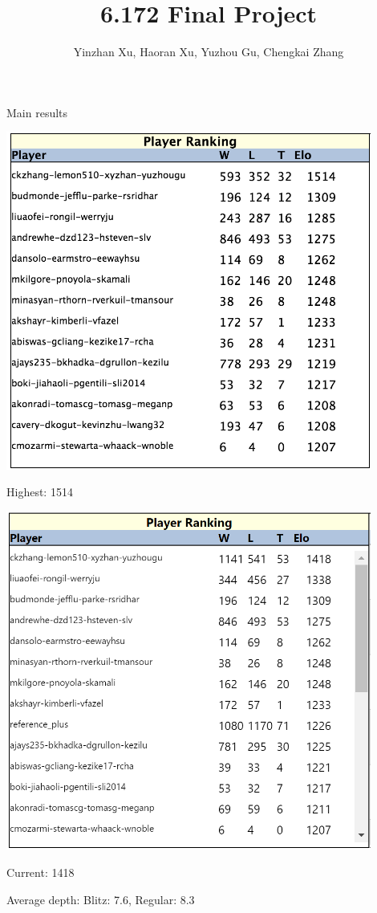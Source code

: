 \documentclass[10pt]{beamer}
\begin{document}
	\title{6.172 Final Project}
	\author{Yinzhan Xu, Haoran Xu, Yuzhou Gu, Chengkai Zhang}
	\date{}

	\begin{frame}
		\titlepage
	\end{frame}

	\begin{frame}{Main results}

        \begin{table}
        \begin{minipage}[b]{0.45\textwidth}
        \centering
        \includegraphics[width=0.9\textwidth]{scrimmage_old.png}

        Highest: 1514
        \end{minipage}
        \begin{minipage}[b]{0.45\textwidth}
        \centering
        \includegraphics[width=0.9\textwidth]{scrimmage_current.png}

        Current: 1418
        \end{minipage}
        \end{table}
        \centering
        Average depth: Blitz: 7.6, Regular: 8.3


	\end{frame}
\end{document}
